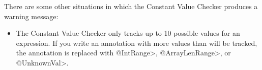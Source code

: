 There are some other situations in which the Constant Value Checker produces a
warning message:

\begin{sloppypar}
\begin{itemize}
\item {}

  The Constant Value Checker only tracks up to 10 possible values for an
  expression.  If you write an annotation with more values than will be
  tracked, the annotation is replaced with \<@IntRange>, \<@ArrayLenRange>, or \<@UnknownVal>.

\end{itemize}
\end{sloppypar}
